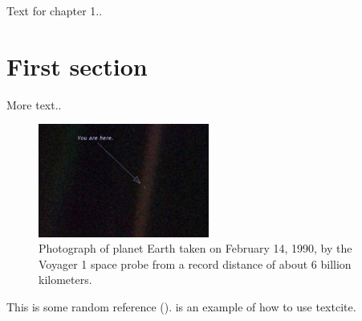 
Text for chapter 1..

\section{First section }

More text..

\begin{figure}[h!]
    \centering
    \includegraphics[width=0.50\textwidth]{images/chap01_images/PaleBlueDot.png}
    \caption{Photograph of planet Earth taken on February 14, 1990, by the Voyager 1 space probe from a record distance of about 6 billion kilometers.}
    \label{fig: PaleBlueDot}    
\end{figure}

This is some random reference (\cite{sanchez2011introduction}). \textcite{parish2009propagation} is an example of how to use textcite.